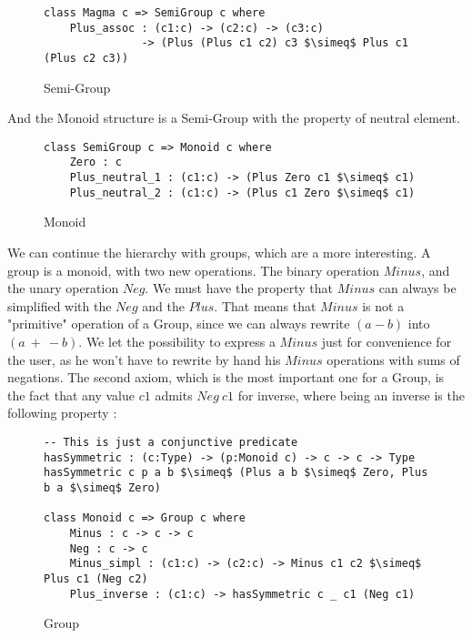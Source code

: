 \begin{figure}[H]
\figrule
\begin{center}
\begin{lstlisting}
class Magma c => SemiGroup c where
    Plus_assoc : (c1:c) -> (c2:c) -> (c3:c) 
               -> (Plus (Plus c1 c2) c3 $\simeq$ Plus c1 (Plus c2 c3))
\end{lstlisting}
\end{center}
\caption{Semi-Group}
\figrule
\end{figure}

And the Monoid structure is a Semi-Group with the property of neutral element.

\begin{figure}[H]
\figrule
\begin{center}
\begin{lstlisting}
class SemiGroup c => Monoid c where
    Zero : c    
    Plus_neutral_1 : (c1:c) -> (Plus Zero c1 $\simeq$ c1)    
    Plus_neutral_2 : (c1:c) -> (Plus c1 Zero $\simeq$ c1)
\end{lstlisting}
\end{center}
\caption{Monoid}
\figrule
\end{figure}
We can continue the hierarchy with groups, which are a more interesting.
A group is a monoid, with two new operations. The binary operation $Minus$, and the unary operation $Neg$. We must have the property that $Minus$ can always be simplified with the $Neg$ and the $Plus$. That means that $Minus$ is not a "primitive" operation of a Group, since we can always rewrite $(a-b)$ into $(a\ +\ -b)$. We let the possibility to express a $Minus$ just for convenience for the user, as he won't have to rewrite by hand his $Minus$ operations with sums of negations.
The second axiom, which is the most important one for a Group, is the fact that any value $c1$ admits $Neg\ c1$ for inverse, where being an inverse is the following property :

\begin{figure}[H]
\figrule
\begin{center}
\begin{lstlisting}
-- This is just a conjunctive predicate
hasSymmetric : (c:Type) -> (p:Monoid c) -> c -> c -> Type
hasSymmetric c p a b $\simeq$ (Plus a b $\simeq$ Zero, Plus b a $\simeq$ Zero)    
  
class Monoid c => Group c where
    Minus : c -> c -> c
    Neg : c -> c
    Minus_simpl : (c1:c) -> (c2:c) -> Minus c1 c2 $\simeq$ Plus c1 (Neg c2) 
    Plus_inverse : (c1:c) -> hasSymmetric c _ c1 (Neg c1)
\end{lstlisting}
\end{center}
\caption{Group}
\figrule
\end{figure}


